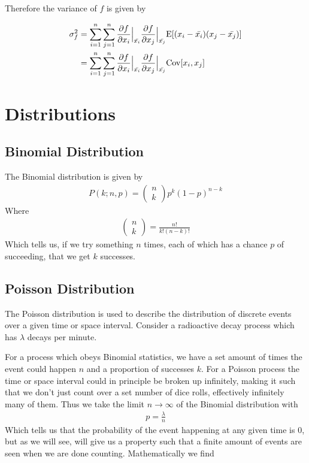 Therefore the variance of $f$ is given by

\begin{align}
\sigma_f^2 &= \sum_{i=1}^n \sum_{j=1}^n \frac{\partial f}{\partial x_i}\Big|_{\bar{x_i}}\frac{\partial f}{\partial x_j}\Big|_{\bar{x_j}}\mathrm{E}[(x_i-\bar{x_i})(x_j-\bar{x_j})]\\
		&= \sum_{i=1}^n \sum_{j=1}^n \frac{\partial f}{\partial x_i}\Big|_{\bar{x_i}}\frac{\partial f}{\partial x_j}\Big|_{\bar{x_j}}\mathrm{Cov}[x_i,x_j]
\end{align}

\label{ch:statistics}

\section{Distributions}
\subsection{Binomial Distribution}
The Binomial distribution is given by
\begin{align}
P(k;n,p) = \begin{pmatrix}
n\\
k
\end{pmatrix}p^k(1-p)^{n-k}
\end{align}
Where 
\begin{align}
\begin{pmatrix}
n\\
k
\end{pmatrix} = \frac{n!}{k!(n-k)!}
\end{align}
Which tells us, if we try something $n$ times, each of which has a chance $p$ of succeeding, that we get $k$ successes. 

\subsection{Poisson Distribution}
The Poisson distribution is used to describe the distribution of discrete events over a given time or space interval. Consider a radioactive decay process which has $\lambda$ decays per minute. 

For a process which obeys Binomial statistics, we have a set amount of times the event could happen $n$ and a proportion of successes $k$. For a Poisson process the time or space interval could in principle be broken up infinitely, making it such that we don't just count over a set number of dice rolls, effectively infinitely many of them. Thus we take the limit $n\rightarrow \infty$ of the Binomial distribution with
\begin{align}
p = \frac{\lambda}{n}
\end{align}
Which tells us that the probability of the event happening at any given time is $0$, but as we will see, will give us a property such that a finite amount of events are seen when we are done counting. Mathematically we find

